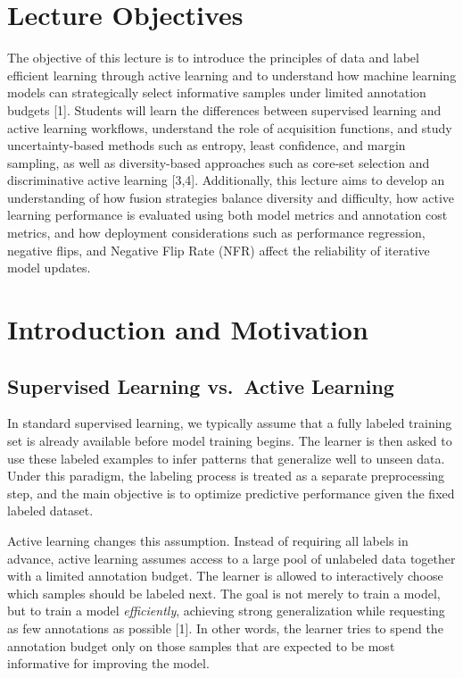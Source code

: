 \documentclass{article}
\renewcommand{\cite}[1]{[#1]}
\begin{document}
\section{Lecture Objectives}

The objective of this lecture is to introduce the principles of data and label efficient learning through active learning and to understand how machine learning models can strategically select informative samples under limited annotation budgets \cite{1}. Students will learn the differences between supervised learning and active learning workflows, understand the role of acquisition functions, and study uncertainty-based methods such as entropy, least confidence, and margin sampling, as well as diversity-based approaches such as core-set selection and discriminative active learning \cite{3,4}. Additionally, this lecture aims to develop an understanding of how fusion strategies balance diversity and difficulty, how active learning performance is evaluated using both model metrics and annotation cost metrics, and how deployment considerations such as performance regression, negative flips, and Negative Flip Rate (NFR) affect the reliability of iterative model updates.

\section{Introduction and Motivation}

\subsection{Supervised Learning vs.\ Active Learning}
In standard supervised learning, we typically assume that a fully labeled training set is already available before model training begins. The learner is then asked to use these labeled examples to infer patterns that generalize well to unseen data. Under this paradigm, the labeling process is treated as a separate preprocessing step, and the main objective is to optimize predictive performance given the fixed labeled dataset.

Active learning changes this assumption. Instead of requiring all labels in advance, active learning assumes access to a large pool of unlabeled data together with a limited annotation budget. The learner is allowed to interactively choose which samples should be labeled next. The goal is not merely to train a model, but to train a model \emph{efficiently}, achieving strong generalization while requesting as few annotations as possible \cite{1}. In other words, the learner tries to spend the annotation budget only on those samples that are expected to be most informative for improving the model.
\end{document}

